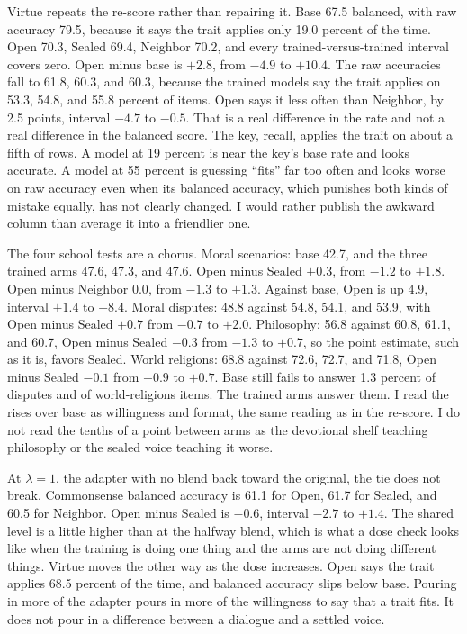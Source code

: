 \documentclass[11pt]{article}
\begin{document}
Virtue repeats the re-score rather than repairing it. Base 67.5 balanced, with raw accuracy 79.5, because it says the trait applies only 19.0 percent of the time. Open 70.3, Sealed 69.4, Neighbor 70.2, and every trained-versus-trained interval covers zero. Open minus base is $+2.8$, from $-4.9$ to $+10.4$. The raw accuracies fall to 61.8, 60.3, and 60.3, because the trained models say the trait applies on 53.3, 54.8, and 55.8 percent of items. Open says it less often than Neighbor, by 2.5 points, interval $-4.7$ to $-0.5$. That is a real difference in the rate and not a real difference in the balanced score. The key, recall, applies the trait on about a fifth of rows. A model at 19 percent is near the key's base rate and looks accurate. A model at 55 percent is guessing ``fits'' far too often and looks worse on raw accuracy even when its balanced accuracy, which punishes both kinds of mistake equally, has not clearly changed. I would rather publish the awkward column than average it into a friendlier one.

The four school tests are a chorus. Moral scenarios: base 42.7, and the three trained arms 47.6, 47.3, and 47.6. Open minus Sealed $+0.3$, from $-1.2$ to $+1.8$. Open minus Neighbor $0.0$, from $-1.3$ to $+1.3$. Against base, Open is up $4.9$, interval $+1.4$ to $+8.4$. Moral disputes: 48.8 against 54.8, 54.1, and 53.9, with Open minus Sealed $+0.7$ from $-0.7$ to $+2.0$. Philosophy: 56.8 against 60.8, 61.1, and 60.7, Open minus Sealed $-0.3$ from $-1.3$ to $+0.7$, so the point estimate, such as it is, favors Sealed. World religions: 68.8 against 72.6, 72.7, and 71.8, Open minus Sealed $-0.1$ from $-0.9$ to $+0.7$. Base still fails to answer 1.3 percent of disputes and of world-religions items. The trained arms answer them. I read the rises over base as willingness and format, the same reading as in the re-score. I do not read the tenths of a point between arms as the devotional shelf teaching philosophy or the sealed voice teaching it worse.

At $\lambda = 1$, the adapter with no blend back toward the original, the tie does not break. Commonsense balanced accuracy is 61.1 for Open, 61.7 for Sealed, and 60.5 for Neighbor. Open minus Sealed is $-0.6$, interval $-2.7$ to $+1.4$. The shared level is a little higher than at the halfway blend, which is what a dose check looks like when the training is doing one thing and the arms are not doing different things. Virtue moves the other way as the dose increases. Open says the trait applies 68.5 percent of the time, and balanced accuracy slips below base. Pouring in more of the adapter pours in more of the willingness to say that a trait fits. It does not pour in a difference between a dialogue and a settled voice.
\end{document}

